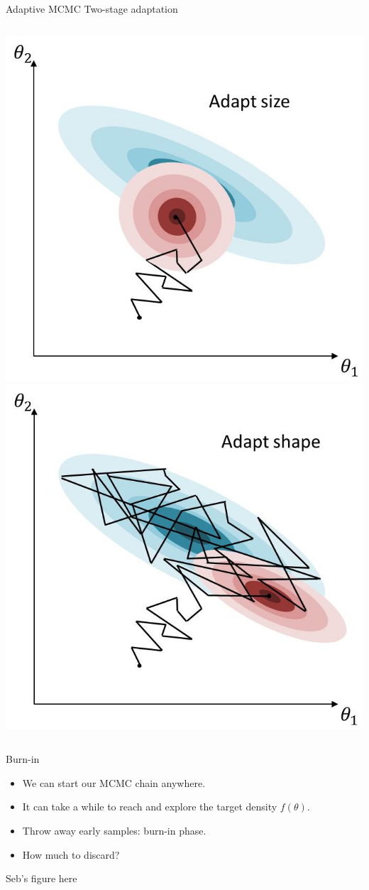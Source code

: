\documentclass[compress]{beamer}
\begin{document}
\begin{frame}[label=sec-8-7]{Adaptive MCMC}
Two-stage adaptation
\begin{columns}[c] 
\includegraphics[width=.8\linewidth]{MH7.jpg}
\includegraphics[width=.8\linewidth]{MH8.jpg}
\end{columns}
\end{frame}

\begin{frame}[label=sec-8-8]{Burn-in}
\begin{itemize}
\item We can start our MCMC chain anywhere.
\item It can take a while to reach and explore the target density $f(\theta)$.
\item Throw away early samples: \alert{burn-in} phase.
\item How much to discard?
\end{itemize}
Seb's figure here 
\end{frame} 
\end{document}
